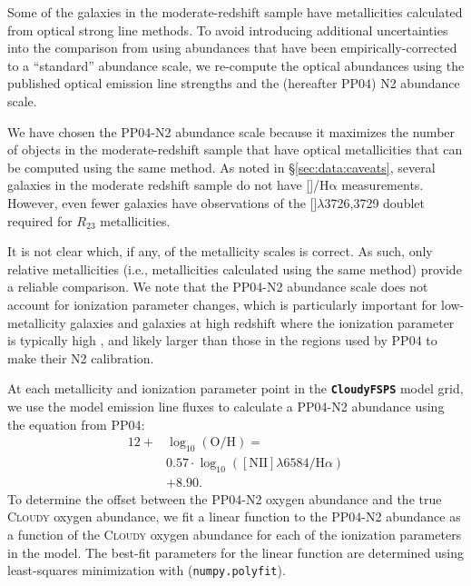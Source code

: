 \documentclass[preprint2]{aastex62}
\newcommand{\CloudyFSPS}{{\tt \textbf{CloudyFSPS}}\xspace}
\newcommand{\Cloudy}{\textsc{Cloudy}\xspace}
\newcommand{\hii}{\ion{H}{2}}
\newcommand{\nii}{[\ion{N}{2}]}
\newcommand{\oii}{[\ion{O}{2}]}
\newcommand{\ha}{\ensuremath{\mathrm{H\alpha}}\xspace}
\newcommand{\logten}{\ensuremath{\log_{10}}}
\newcommand{\logOH}{\ensuremath{\logten (\mathrm{O}/\mathrm{H})}\xspace}
\begin{document}
Some of the galaxies in the moderate-redshift sample have metallicities calculated from optical strong line methods. To avoid introducing additional uncertainties into the comparison from using abundances that have been empirically-corrected to a ``standard'' abundance scale, we re-compute the optical abundances using the published optical emission line strengths and the \citet{Pettini+2004} (hereafter PP04) N2 abundance scale.

We have chosen the PP04-N2 abundance scale because it maximizes the number of objects in the moderate-redshift sample that have optical metallicities that can be computed using the same method. As noted in \S\ref{sec:data:caveats}, several galaxies in the moderate redshift sample do not have \nii{}/\ha{} measurements. However, even fewer galaxies have observations of the \oii{}$\lambda$3726,3729 doublet required for $R_{23}$ metallicities. 

It is not clear which, if any, of the metallicity scales is correct. As such, only relative metallicities (i.e., metallicities calculated using the same method) provide a reliable comparison. We note that the PP04-N2 abundance scale does not account for ionization parameter changes, which is particularly important for low-metallicity galaxies and galaxies at high redshift where the ionization parameter is typically high \citep[e.g.,][]{Kewley+2013a, Kewley+2013b, Masters+2014, Sanders+2016, Bian+2017, Strom+2017}, and likely larger than those in the \hii{} regions used by PP04 to make their N2 calibration.

At each metallicity and ionization parameter point in the \CloudyFSPS model grid, we use the model emission line fluxes to calculate a PP04-N2 abundance using the equation from PP04:
\begin{equation}\label{eq:O3N2}
\begin{aligned}
12 +& \logOH = \\
& 0.57 \cdot \log_{10}([\mathrm{NII}]\lambda6584/\mathrm{H}\alpha)\\
& + 8.90.
\end{aligned}
\end{equation}
To determine the offset between the PP04-N2 oxygen abundance and the true \Cloudy oxygen abundance, we fit a linear function to the PP04-N2 abundance as a function of the \Cloudy oxygen abundance for each of the ionization parameters in the model. The best-fit parameters for the linear function are determined using least-squares minimization with ({\tt numpy.polyfit}).
\end{document}
